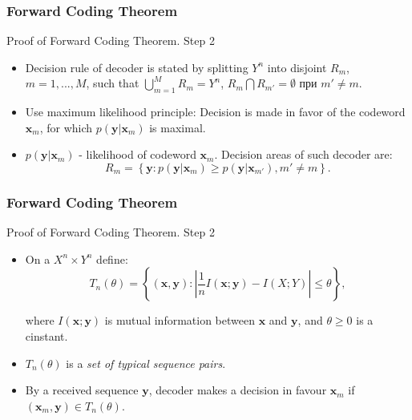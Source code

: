 \documentclass[14pt]{beamer}
\renewcommand{\vec}[1]{\ensuremath{\boldsymbol{#1}}}
\begin{document}
\begin{frame}
\frametitle{Forward Coding Theorem}
Proof of Forward Coding Theorem. Step 2
\begin{itemize}

    \item Decision rule of decoder is stated by splitting $Y^n$ into disjoint $R_m $, $m = 1,...,M$, such that $\bigcup_{m = 1}^{M} R_m = Y^n $, $R_m \bigcap R_{m'} =\emptyset$ при $m' \ne m$. 
    
    \item Use maximum likelihood principle:
    Decision is made in favor of the codeword ${\vec x}_m $, for which $p({\vec y}\vert {\vec x}_m )$ is maximal.

    \item $p({\vec y}\vert {\vec x}_m )$ - likelihood of codeword ${\vec x}_m $. Decision areas of such decoder are:
    \[
    R_m = \left\{ {{\vec y}:p({\vec y}\vert {\vec x}_m ) \ge%
    p({\vec y}\vert {\vec x}_{m'} ),m' \ne m} \right\}.
    \]

\end{itemize}
\end{frame}


\begin{frame}
\frametitle{Forward Coding Theorem}
Proof of Forward Coding Theorem. Step 2
\begin{itemize}

    \item On a $X^n\times Y^n$ define:
    \begin{equation}
        \label{eq5_45} T_n(\theta) = \left\{ ({\vec x},{\vec y}):\left| {\frac{1}{n}I({\vec x};{\vec y}) - I(X;Y) } \right| \le \theta \right\},
    \end{equation}

    where $I({\vec x};{\vec y})$ is mutual information between ${\vec x}$ and ${\vec y}$, and  $\theta \ge 0$ is a cinstant.

    \item  $T_n(\theta)$ is a \emph{set of typical sequence pairs}.

    \item By a received sequence ${\vec y}$, decoder makes a decision in favour ${\vec x}_m $ if $(\vec x_m ,\vec y) \in T_n(\theta)$. 
    
    
\end{itemize}
\end{frame}
\end{document}
